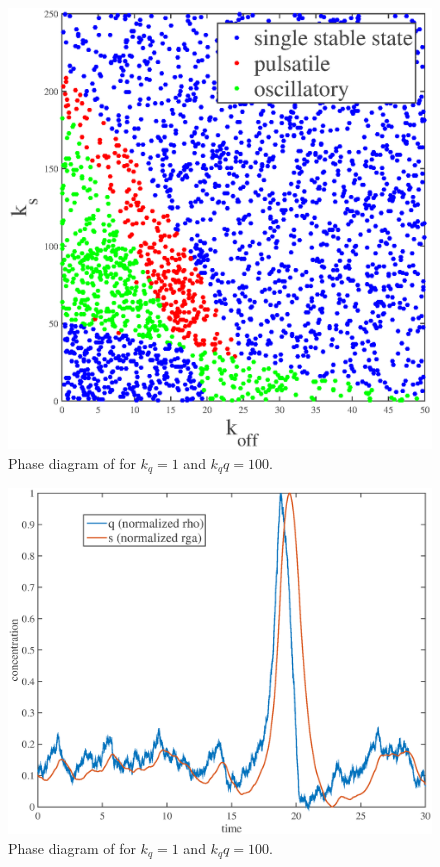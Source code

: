 \begin{figure}[h!]
\centering
\includegraphics[width=\hsize]{pulse/k_phase.eps}
\caption{\label{fig:pulse_fit}  Phase diagram of for $k_q=1$ and $k_qq=100$.}
\end{figure}

\begin{figure}[h!]
\centering
\includegraphics[width=\hsize]{pulse/randomized_simulation.eps}
\caption{\label{fig:pulse_fit}  Phase diagram of for $k_q=1$ and $k_qq=100$.}
\end{figure}

